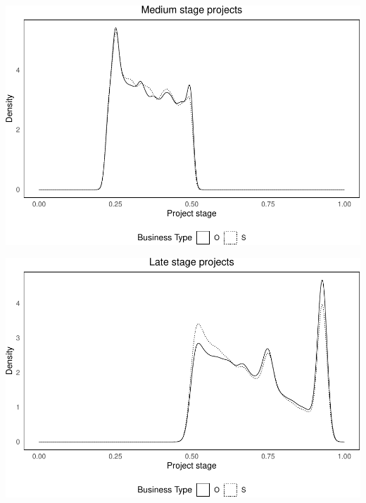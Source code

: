 \documentclass[
]{article}
\begin{document}
\includegraphics{qp_first_pc_delay-2_files/figure-latex/stage_plots_tercile_2-1.pdf}

\includegraphics{qp_first_pc_delay-2_files/figure-latex/stage_plots_tercile_3-1.pdf}
\end{document}
